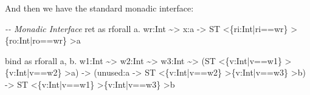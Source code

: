 \documentclass[
]{darts-v2021}
\newenvironment{Shaded}{}{}
\newcommand{\CommentTok}[1]{\textcolor[rgb]{0.38,0.63,0.69}{\textit{#1}}}
\newcommand{\DataTypeTok}[1]{\textcolor[rgb]{0.56,0.13,0.00}{#1}}
\newcommand{\NormalTok}[1]{#1}
\newcommand{\OperatorTok}[1]{\textcolor[rgb]{0.40,0.40,0.40}{#1}}
\newcommand{\OtherTok}[1]{\textcolor[rgb]{0.00,0.44,0.13}{#1}}
\begin{document}
And then we have the standard monadic interface:

\begin{Shaded}
\begin{Highlighting}[numbers=left,,]
\CommentTok{{-}{-} Monadic Interface}
\NormalTok{ret as rforall a}\OperatorTok{.}\NormalTok{ wr}\OperatorTok{:}\DataTypeTok{Int} \OperatorTok{\textasciitilde{}\textgreater{}}\NormalTok{ x}\OperatorTok{:}\NormalTok{a }\OtherTok{{-}\textgreater{}} \DataTypeTok{ST} \OperatorTok{\textless{}}\NormalTok{\{ri}\OperatorTok{:}\DataTypeTok{Int}\OperatorTok{|}\NormalTok{ri}\OperatorTok{==}\NormalTok{wr\} }\OperatorTok{\textgreater{}}\NormalTok{\{ro}\OperatorTok{:}\DataTypeTok{Int}\OperatorTok{|}\NormalTok{ro}\OperatorTok{==}\NormalTok{wr\} }\OperatorTok{\textgreater{}}\NormalTok{a}
\end{Highlighting}
\end{Shaded}

\begin{Shaded}
\begin{Highlighting}[numbers=left,,firstnumber=11,]
\NormalTok{bind as rforall a, b}\OperatorTok{.}\NormalTok{ w1}\OperatorTok{:}\DataTypeTok{Int} \OperatorTok{\textasciitilde{}\textgreater{}}\NormalTok{ w2}\OperatorTok{:}\DataTypeTok{Int} \OperatorTok{\textasciitilde{}\textgreater{}}\NormalTok{ w3}\OperatorTok{:}\DataTypeTok{Int} \OperatorTok{\textasciitilde{}\textgreater{}}
\NormalTok{  (}\DataTypeTok{ST} \OperatorTok{\textless{}}\NormalTok{\{v}\OperatorTok{:}\DataTypeTok{Int}\OperatorTok{|}\NormalTok{v}\OperatorTok{==}\NormalTok{w1\} }\OperatorTok{\textgreater{}}\NormalTok{\{v}\OperatorTok{:}\DataTypeTok{Int}\OperatorTok{|}\NormalTok{v}\OperatorTok{==}\NormalTok{w2\} }\OperatorTok{\textgreater{}}\NormalTok{a)}
  \OtherTok{{-}\textgreater{}}\NormalTok{ (unused}\OperatorTok{:}\NormalTok{a }\OtherTok{{-}\textgreater{}} \DataTypeTok{ST} \OperatorTok{\textless{}}\NormalTok{\{v}\OperatorTok{:}\DataTypeTok{Int}\OperatorTok{|}\NormalTok{v}\OperatorTok{==}\NormalTok{w2\} }\OperatorTok{\textgreater{}}\NormalTok{\{v}\OperatorTok{:}\DataTypeTok{Int}\OperatorTok{|}\NormalTok{v}\OperatorTok{==}\NormalTok{w3\} }\OperatorTok{\textgreater{}}\NormalTok{b)}
  \OtherTok{{-}\textgreater{}} \DataTypeTok{ST} \OperatorTok{\textless{}}\NormalTok{\{v}\OperatorTok{:}\DataTypeTok{Int}\OperatorTok{|}\NormalTok{v}\OperatorTok{==}\NormalTok{w1\} }\OperatorTok{\textgreater{}}\NormalTok{\{v}\OperatorTok{:}\DataTypeTok{Int}\OperatorTok{|}\NormalTok{v}\OperatorTok{==}\NormalTok{w3\} }\OperatorTok{\textgreater{}}\NormalTok{b}
\end{Highlighting}
\end{Shaded}
\end{document}
